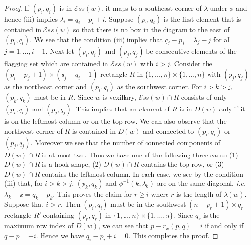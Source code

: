 \documentclass[12pt, reqno,sumlimits]{amsart}
\theoremstyle{definition}
\numberwithin{equation}{section}
\newcommand{\Ess}{{\mathcal{E}ss}}
\begin{document}
\begin{proof}
If $(p_i,q_i)$ is in $\Ess(w)$, it maps to a southeast corner of $\lambda$ under $\phi$ and hence (iii) implies $\lambda_i = q_i-p_i +i$. Suppose $(p_i,q_i)$ is the first element that is contained in $\Ess(w)$ so that there is no box in the diagram to the east of $(p_i,q_i)$. We see that the condition (iii) implies that $q_j-p_j =\lambda_j-j$ for all $j=1,\dots,i-1$. Next let $(p_i,q_i)$ and $(p_j,q_j)$ be consecutive elements of the flagging set which are contained in $\Ess(w)$ with $i>j$. Consider the $(p_i-p_j+1)\times (q_j-q_i+1)$ rectangle $R$ in $\{1,...,n\}\times \{1,...,n\} $ with $(p_j,q_j)$ as the northeast corner and $(p_i,q_i)$ as the southwest corner. For $i>k>j$, $(p_k,q_k)$ must be in $R$. Since $w$ is vexillary, $\Ess(w)\cap R$ consists of only $(p_i,q_i)$ and $(p_j,q_j)$. This implies that an element of $R$ is in $D(w)$ only if it is on the leftmost column or on the top row. We can also observe that the northwest corner of $R$ is contained in $D(w)$ and connected to $(p_i,q_i)$ or $(p_j,q_j)$. Moreover we see that the number of connected components of $D(w) \cap R$ is at most two. Thus we have one of the following three cases: (1) $D(w)\cap R$ is a hook shape, (2)  $D(w)\cap R$ contains the top row, or (3) $D(w)\cap R$ contains the leftmost column. In each case, we see by the condition (iii) that, for $i>k>j$, $(p_k,q_k)$ and $\phi^{-1}(k,\lambda_k)$ are on the same diagonal, {\it i.e.} $\lambda_k-k=q_k-p_k$. This proves the claim for $r\geq i$ where $r$ is the length of $\lambda(w)$. Suppose that $i>r$. Then $(p_i, q_i)$ must be in the southwest $(n-p_r+1)\times q_r$ rectangle $R'$ containing $(p_r,q_r)$ in $\{1,\dots,n\}\times \{1,\dots, n\}$. Since $q_r$ is the maximum row index of $D(w)$, we can see that $p-r_w(p,q)=i$ if and only if $q-p=-i$. Hence we have $q_i-p_i + i =0$. This completes the proof.
\end{proof}
\end{document}
